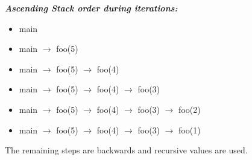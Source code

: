 \documentclass[12pt]{article}
\begin{document}
\textbf{\textit{Ascending Stack order during iterations:}} \\
\begin{itemize}
    \item main
    \item main $\rightarrow$ foo(5)
    \item main $\rightarrow$ foo(5) $\rightarrow$ foo(4)
    \item main $\rightarrow$ foo(5) $\rightarrow$ foo(4) $\rightarrow$ foo(3)
    \item main $\rightarrow$ foo(5) $\rightarrow$ foo(4) $\rightarrow$ foo(3) $\rightarrow$ foo(2)
    \item main $\rightarrow$ foo(5) $\rightarrow$ foo(4) $\rightarrow$ foo(3) $\rightarrow$ foo(1) 
\end{itemize}

The remaining steps are backwards and recursive values are used.
\end{document}
